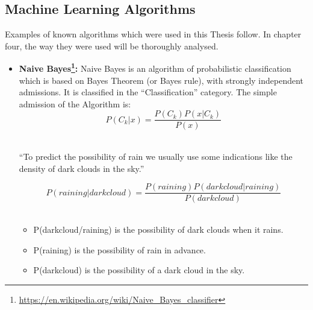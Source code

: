 \subsection{Machine Learning Algorithms}\label{212_ref}
Examples of known algorithms which were used in this Thesis follow. In chapter four, the way they were used will be thoroughly analysed.\\
\begin{itemize}
	
	\item \textbf{Naive Bayes\footnote{\url{https://en.wikipedia.org/wiki/Naive_Bayes_classifier}}:} Naive Bayes is an algorithm of probabilistic classification which is based on Bayes Theorem (or Bayes rule), with strongly independent admissions. It is classified in the ``Classification'' category. The simple admission of the Algorithm is:\\

\begin{equation}
P\left(C_{k}|x\right)=\frac{P\left(C_{k}\right)P\left(x|C_{k}\right)}{P\left(x\right)}
\end{equation}
\\
\begin{example}
	``To predict the possibility of rain we usually use some indications like the density of dark clouds in the sky.''\\
\end{example}

\begin{equation}
P\left(raining|darkcloud\right)=\frac{P\left(raining\right)P\left(darkcloud|raining\right)}{P\left(darkcloud\right)}
\end{equation}
\\
\begin{itemize}

	\item P(darkcloud/raining) is the possibility of dark clouds when it rains.
	\item P(raining) is the possibility of rain in advance.
	\item P(darkcloud) is the possibility of a dark cloud in the sky.\\

\end{itemize}



\end{itemize}
